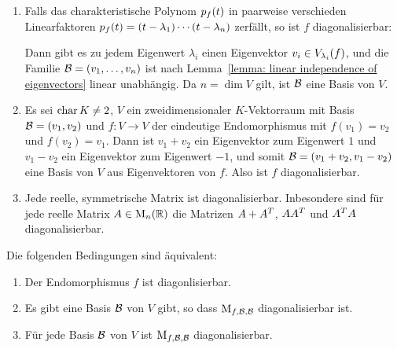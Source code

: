\begin{example}
  \leavevmode
  \begin{enumerate}
    \item
      Falls das charakteristische Polynom $\charpol{f}(t)$ in paarweise verschieden Linearfaktoren $\charpol{f}(t) = (t - \lambda_1) \dotsm (t - \lambda_n)$ zerfällt, so ist $f$ diagonalisierbar:
      
      Dann gibt es zu jedem Eigenwert $\lambda_i$ einen Eigenvektor $v_i \in \eigenspace{V}{f}{\lambda_i}$, und die Familie $\basis{B} = (v_1, \dotsc, v_n)$ ist nach Lemma~\ref{lemma: linear independence of eigenvectors} linear unabhängig.
      Da $n = \dim V$ gilt, ist $\basis{B}$ eine Basis von $V$.
      
    \item
      Es sei $\ringchar{K} \neq 2$, $V$ ein zweidimensionaler $K$-Vektorraum mit Basis $\basis{B} = (v_1, v_2)$ und $f \colon V \to V$ der eindeutige Endomorphismus mit $f(v_1) = v_2$ und $f(v_2) = v_1$.
      Dann ist $v_1 + v_2$ ein Eigenvektor zum Eigenwert $1$ und $v_1 - v_2$ ein Eigenvektor zum Eigenwert $-1$, und somit $\basis{B} = (v_1 + v_2, v_1 - v_2)$  eine Basis von $V$ aus Eigenvektoren von $f$.
      Also ist $f$ diagonalisierbar.
      
    \item
      Jede reelle, symmetrische Matrix ist diagonalisierbar.
      Inbesondere sind für jede reelle Matrix $A \in \matrices{n}{\Real}$ die Matrizen $A + \transpose{A}$, $A \transpose{A}$ und $\transpose{A} A$ diagonalisierbar.
  \end{enumerate}
\end{example}

\begin{lemma}
  Die folgenden Bedingungen sind äquivalent:
  \begin{enumerate}
    \item
      Der Endomorphismus $f$ ist diagonlisierbar.
    \item
      Es gibt eine Basis $\basis{B}$ von $V$ gibt, so dass $\repmatrixendo{f}{\basis{B}}$ diagonalisierbar ist.
    \item
      Für jede Basis $\basis{B}$ von $V$ ist $\repmatrixendo{f}{\basis{B}}$ diagonalisierbar.
  \end{enumerate}
\end{lemma}

